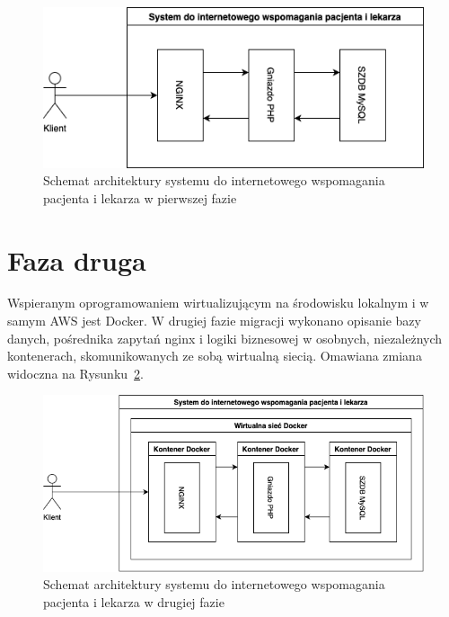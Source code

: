 \documentclass[12pt,twoside]{book}
\newcommand{\captionvspace}{\vspace{6pt}}
\begin{document}
\begin{figure}[ht]
\centering
\includegraphics[width=\textwidth]{includes/images/migration-phase-1.png}
\captionvspace
\caption{Schemat architektury systemu do internetowego wspomagania pacjenta i lekarza w pierwszej fazie}
\label{fig:migration-phase-1}
\end{figure}

\section{Faza druga}
Wspieranym oprogramowaniem wirtualizującym na środowisku lokalnym i w samym AWS jest Docker. W drugiej fazie migracji wykonano opisanie bazy danych, pośrednika zapytań nginx i logiki biznesowej w osobnych, niezależnych kontenerach, skomunikowanych ze sobą wirtualną siecią. Omawiana zmiana widoczna na Rysunku~\ref{fig:migration-phase-2}.

\begin{figure}[ht]
\centering
\includegraphics[width=\textwidth]{includes/images/migration-phase-2.png}
\captionvspace
\caption{Schemat architektury systemu do internetowego wspomagania pacjenta i lekarza w drugiej fazie}
\label{fig:migration-phase-2}
\end{figure}
\end{document}
